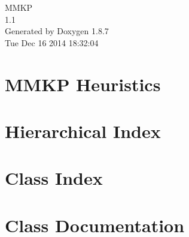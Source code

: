 \documentclass[twoside]{book}
\newcommand{\+}{\discretionary{\mbox{\scriptsize$\hookleftarrow$}}{}{}}
\newcommand{\clearemptydoublepage}{%
  \newpage{\pagestyle{empty}\cleardoublepage}%
}
\begin{document}
\hypersetup{pageanchor=false,
             bookmarks=true,
             bookmarksnumbered=true,
             pdfencoding=unicode
            }
\begin{titlepage}
\vspace*{7cm}
\begin{center}%
{\Large M\+M\+K\+P \\[1ex]\large 1.\+1 }\\
\vspace*{1cm}
{\large Generated by Doxygen 1.8.7}\\
\vspace*{0.5cm}
{\small Tue Dec 16 2014 18:32:04}\\
\end{center}
\end{titlepage}
\clearemptydoublepage
\tableofcontents
\clearemptydoublepage
{}
\hypersetup{pageanchor=true}

\chapter{M\+M\+K\+P Heuristics}
\label{index}\hypertarget{index}{}
\chapter{Hierarchical Index}

\chapter{Class Index}

\chapter{Class Documentation}

































\newpage
{}
{}
\printindex
\end{document}
